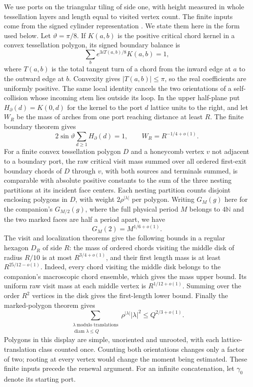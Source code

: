 We use ports on the triangular tiling of side one, with height measured in
whole tessellation layers and length equal to visited vertex count.
The finite inputs come from the signed cylinder representation
\cite[Section~2, Propositions~9.1--9.2 and Theorems~1.1--1.2]{RenewalSignedCompanion}.
We state them here in the form used below.
Let $\vartheta=\pi/8$.  If $K(a,b)$ is the positive critical chord kernel in
a convex tessellation polygon, its signed boundary balance is
\[
 \sum_b e^{3iT(a,b)/8}K(a,b)=1,
\]
where $T(a,b)$ is the total tangent turn of a chord from the inward edge
at $a$ to the outward edge at $b$.  Convexity gives
$|T(a,b)|\le\pi$, so the real coefficients are uniformly positive.
The same local identity cancels the two orientations of a self-collision
whose incoming stem lies outside its loop.  In the upper half-plane put
$H_\partial(d)=K(0,d)$ for the kernel to the port $d$ lattice units to the
right, and let $W_R$ be the mass of arches from one port reaching distance
at least $R$.  The finite boundary theorem gives
\begin{equation}\label{R:alt:j:finite-boundary}
 2\sin\vartheta\sum_{d\ge1}H_\partial(d)=1,
 \qquad W_R=R^{-1/4+o(1)}.
\end{equation}
For a finite convex tessellation polygon $D$ and a honeycomb vertex $v$
not adjacent to a boundary port, the raw critical visit mass summed over
all ordered first-exit boundary chords of $D$ through $v$, with both
sources and terminals summed, is comparable with absolute positive
constants to the sum of the three nesting partitions at its incident
face centers. Each nesting partition counts disjoint enclosing polygons
in $D$, with weight $2\rho^{|\lambda|}$ per polygon.
Writing $G_M(g)$ here for the companion's $G_{M/2}(g)$, where the full
physical period $M$ belongs to $4\mathbb N$ and the two marked faces are
half a period apart, we have
\begin{equation}\label{R:alt:j:finite-cylinder}
 G_M(2)=M^{1/6+o(1)}.
\end{equation}
The visit and localization theorems give the following bounds in a regular
hexagon $D_R$ of side $R$: the mass of ordered chords visiting the middle
disk of radius $R/10$ is at most $R^{3/4+o(1)}$, and their first length
mass is at least $R^{25/12-o(1)}$. Indeed, every chord visiting the middle
disk belongs to the companion's macroscopic chord ensemble, which gives
the mass upper bound. Its uniform raw visit mass at each middle vertex is
$R^{1/12+o(1)}$. Summing over the order $R^2$ vertices in the disk gives
the first-length lower bound. Finally the marked-polygon theorem gives
\begin{equation}\label{R:alt:j:polygon-input}
 \sum_{\substack{\lambda\ \text{modulo translations}\\
                   \operatorname{diam}\lambda\le Q}}
       \rho^{|\lambda|}|\lambda|^2\le Q^{2/3+o(1)}.
\end{equation}
Polygons in this display are simple, unoriented and unrooted, with each
lattice-translation class counted once. Counting both orientations changes
only a factor of two; rooting at every vertex would change the moment
being estimated. These finite inputs precede the renewal argument.
For an infinite concatenation, let $\gamma_0$ denote its starting port.

